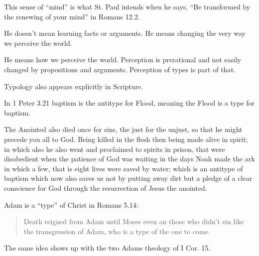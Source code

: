 \documentclass{beamer}
\begin{document}
\begin{frame}
  This sense of ``mind'' is what St. Paul intends when he says, ``Be transformed by the renewing of your mind'' in Romans 12.2.
\end{frame}

\begin{frame}
  He doesn't mean learning facts or arguments.
  He means changing the very way we perceive the world.
\end{frame}

\begin{frame}
  He means how we perceive the world.
  Perception is prerational and not easily changed by propositions and arguments.
  Perception of types is part of that.
\end{frame}

\begin{frame}
  Typology also appears explicitly in Scripture.
\end{frame}

\begin{frame}
  In 1 Peter 3.21 baptism is the antitype for Flood, meaning the Flood is a type for baptism.
\end{frame}

\begin{frame}
  The Anointed also died once for sins, the just for the unjust, so that he might precede you all to God.
  Being killed in the flesh then being made alive in spirit;
  in which also he also went and proclaimed to spirits in prison,
  that were disobedient when the patience of God was waiting in the days Noah made the ark in which a few, that is eight lives were saved by water;
  which is an antitype of baptism which now also saves us not by putting away dirt but a pledge of a clear conscience for God through the resurrection of Jesus the anointed.
\end{frame}

\begin{frame}
  Adam is a ``type'' of Christ in Romans 5.14:
  \begin{quote}
	Death reigned from Adam until Moses even on those who didn't sin like the transgression of Adam, who is a type of the one to come.
  \end{quote}
\end{frame}

\begin{frame}
  The same idea shows up with the two Adams theology of I Cor. 15.
\end{frame}
\end{document}
